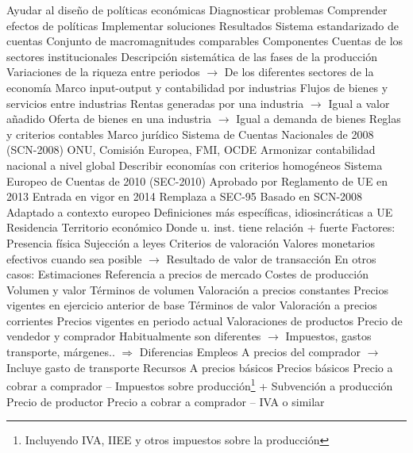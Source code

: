 \documentclass{nuevotema}
\begin{document}
\begin{esquemal}
				\4 Ayudar al diseño de políticas económicas
				\4[] Diagnosticar problemas
				\4[] Comprender efectos de políticas
				\4[] Implementar soluciones
			\3 Resultados
				\4 Sistema estandarizado de cuentas
				\4 Conjunto de macromagnitudes comparables
				\4 Componentes
				\4[] Cuentas de los sectores institucionales
				\4[] Descripción sistemática de las fases de la producción
				\4[] Variaciones de la riqueza entre periodos
				\4[] $\to$ De los diferentes sectores de la economía
				\4 Marco input-output y contabilidad por industrias
				\4[] Flujos de bienes y servicios entre industrias
				\4[] Rentas generadas por una industria
				\4[] $\to$ Igual a valor añadido
				\4[] Oferta de bienes en una industria
				\4[] $\to$ Igual a demanda de bienes
		\2 Reglas y criterios contables
			\3 Marco jurídico
				\4 Sistema de Cuentas Nacionales de 2008 (SCN-2008)
				\4[] ONU, Comisión Europea, FMI, OCDE
				\4[] Armonizar contabilidad nacional a nivel global
				\4[] Describir economías con criterios homogéneos
				\4 Sistema Europeo de Cuentas de 2010 (SEC-2010)
				\4[] Aprobado por Reglamento de UE en 2013
				\4[] Entrada en vigor en 2014
				\4[] Remplaza a SEC-95
				\4[] Basado en SCN-2008
				\4[] Adaptado a contexto europeo
				\4[] Definiciones más específicas, idiosincráticas a UE
			\3 Residencia
				\4 Territorio económico
				\4[] Donde u. inst. tiene relación + fuerte
				\4 Factores:
				\4[] Presencia física
				\4[] Sujección a leyes
			\3 Criterios de valoración
				\4 Valores monetarios efectivos cuando sea posible
				\4[] $\to$ Resultado de valor de transacción
				\4 En otros casos:
				\4[] Estimaciones
				\4[] Referencia a precios de mercado
				\4[] Costes de producción
			\3 Volumen y valor
				\4 Términos de volumen
				\4[] Valoración a precios constantes
				\4[] Precios vigentes en ejercicio anterior de base
				\4 Términos de valor
				\4[] Valoración a precios corrientes
				\4[] Precios vigentes en periodo actual
			\3 Valoraciones de productos
				\4 Precio de vendedor y comprador
				\4[] Habitualmente son diferentes
				\4[] $\to$ Impuestos, gastos transporte, márgenes..
				\4[] $\Rightarrow$ Diferencias
				\4 Empleos
				\4[] A precios del comprador
				\4[] $\to$ Incluye gasto de transporte
				\4 Recursos
				\4[] A precios básicos
				\4 Precios básicos
				\4[] Precio a cobrar a comprador
				\4[] -- Impuestos sobre producción\footnote{Incluyendo IVA, IIEE y otros impuestos sobre la producción}
				\4[] + Subvención a producción
				\4 Precio de productor
				\4[] Precio a cobrar a comprador
				\4[] -- IVA o similar

\end{esquemal}
\end{document}
